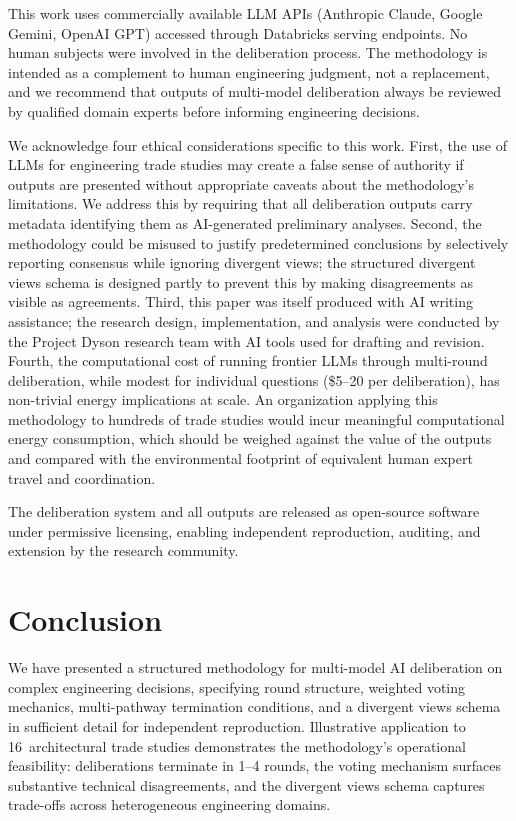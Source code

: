 \documentclass[11pt,a4paper]{article}
\begin{document}
This work uses commercially available LLM APIs (Anthropic Claude, Google Gemini, OpenAI GPT) accessed through Databricks serving endpoints. No human subjects were involved in the deliberation process. The methodology is intended as a complement to human engineering judgment, not a replacement, and we recommend that outputs of multi-model deliberation always be reviewed by qualified domain experts before informing engineering decisions.

We acknowledge four ethical considerations specific to this work. First, the use of LLMs for engineering trade studies may create a false sense of authority if outputs are presented without appropriate caveats about the methodology's limitations. We address this by requiring that all deliberation outputs carry metadata identifying them as AI-generated preliminary analyses. Second, the methodology could be misused to justify predetermined conclusions by selectively reporting consensus while ignoring divergent views; the structured divergent views schema is designed partly to prevent this by making disagreements as visible as agreements. Third, this paper was itself produced with AI writing assistance; the research design, implementation, and analysis were conducted by the Project Dyson research team with AI tools used for drafting and revision. Fourth, the computational cost of running frontier LLMs through multi-round deliberation, while modest for individual questions (\$5--20 per deliberation), has non-trivial energy implications at scale. An organization applying this methodology to hundreds of trade studies would incur meaningful computational energy consumption, which should be weighed against the value of the outputs and compared with the environmental footprint of equivalent human expert travel and coordination.

The deliberation system and all outputs are released as open-source software under permissive licensing, enabling independent reproduction, auditing, and extension by the research community.

\section{Conclusion}
\label{sec:conclusion}

We have presented a structured methodology for multi-model AI deliberation on complex engineering decisions, specifying round structure, weighted voting mechanics, multi-pathway termination conditions, and a divergent views schema in sufficient detail for independent reproduction. Illustrative application to 16~architectural trade studies demonstrates the methodology's operational feasibility: deliberations terminate in 1--4 rounds, the voting mechanism surfaces substantive technical disagreements, and the divergent views schema captures trade-offs across heterogeneous engineering domains.
\end{document}

